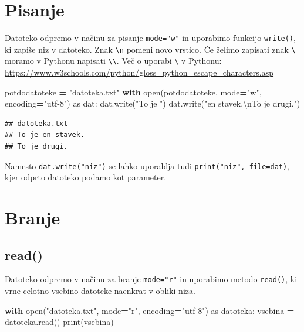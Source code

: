 \documentclass[
]{report}
\newenvironment{Shaded}{\begin{snugshade}}{\end{snugshade}}
\newcommand{\BuiltInTok}[1]{#1}
\newcommand{\CharTok}[1]{\textcolor[rgb]{0.31,0.60,0.02}{#1}}
\newcommand{\ControlFlowTok}[1]{\textcolor[rgb]{0.13,0.29,0.53}{\textbf{#1}}}
\newcommand{\ImportTok}[1]{#1}
\newcommand{\NormalTok}[1]{#1}
\newcommand{\OperatorTok}[1]{\textcolor[rgb]{0.81,0.36,0.00}{\textbf{#1}}}
\newcommand{\StringTok}[1]{\textcolor[rgb]{0.31,0.60,0.02}{#1}}
\begin{document}
\hypertarget{pisanje}{%
\section{Pisanje}\label{pisanje}}

Datoteko odpremo v načinu za pisanje \texttt{mode="w"} in uporabimo funkcijo \texttt{write()},
ki zapiše niz v datoteko. Znak \texttt{\textbackslash{}n} pomeni novo vrstico. Če želimo zapisati znak \texttt{\textbackslash{}}
moramo v Pythonu napisati \texttt{\textbackslash{}\textbackslash{}}. Več o uporabi \texttt{\textbackslash{}} v Pythonu: \url{https://www.w3schools.com/python/gloss_python_escape_characters.asp}

\begin{Shaded}
\begin{Highlighting}[]
\NormalTok{potdodatoteke }\OperatorTok{=} \StringTok{"datoteka.txt"}
\ControlFlowTok{with} \BuiltInTok{open}\NormalTok{(potdodatoteke, mode}\OperatorTok{=}\StringTok{"w"}\NormalTok{, encoding}\OperatorTok{=}\StringTok{"utf{-}8"}\NormalTok{) }\ImportTok{as}\NormalTok{ dat:}
\NormalTok{    dat.write(}\StringTok{"To je "}\NormalTok{)}
\NormalTok{    dat.write(}\StringTok{"en stavek.}\CharTok{\textbackslash{}n}\StringTok{To je drugi."}\NormalTok{)}
\end{Highlighting}
\end{Shaded}

\begin{verbatim}
## datoteka.txt
## To je en stavek.
## To je drugi.
\end{verbatim}

Namesto \texttt{dat.write("niz")} se lahko uporablja tudi \texttt{print("niz",\ file=dat)}, kjer
odprto datoteko podamo kot parameter.

\hypertarget{branje}{%
\section{Branje}\label{branje}}

\hypertarget{read}{%
\subsection{read()}\label{read}}

Datoteko odpremo v načinu za branje \texttt{mode="r"} in uporabimo metodo \texttt{read()},
ki vrne celotno vsebino datoteke naenkrat v obliki niza.

\begin{Shaded}
\begin{Highlighting}[]
\ControlFlowTok{with} \BuiltInTok{open}\NormalTok{(}\StringTok{"datoteka.txt"}\NormalTok{, mode}\OperatorTok{=}\StringTok{"r"}\NormalTok{, encoding}\OperatorTok{=}\StringTok{"utf{-}8"}\NormalTok{) }\ImportTok{as}\NormalTok{ datoteka:}
\NormalTok{    vsebina }\OperatorTok{=}\NormalTok{ datoteka.read()}
\BuiltInTok{print}\NormalTok{(vsebina)}
\end{Highlighting}
\end{Shaded}
\end{document}
